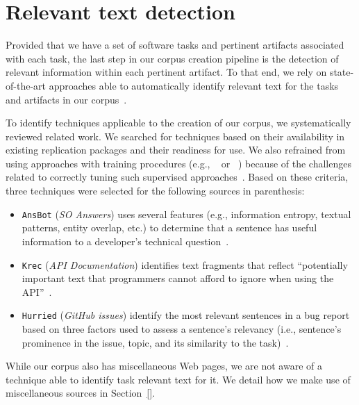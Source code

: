 


\section{Relevant text detection}
\label{cp4:corpus-relevant-text}


Provided that we have a set of software tasks and pertinent artifacts associated with each task, 
the last step in our corpus creation pipeline is the detection of relevant information within 
each pertinent artifact. To that end, we rely on state-of-the-art approaches able to automatically identify relevant text for the tasks and artifacts in our corpus~\cite{nadi2020, Robillard2015, Lotufo2012, Xu2017}.


To identify techniques applicable to the creation of our corpus, we systematically reviewed related work. We searched for techniques based on their availability in existing replication packages and their readiness for use.
We also refrained from using approaches with training procedures (e.g., ~\cite{liu2020} or ~\cite{Treude2016}) because of the challenges related to correctly tuning such supervised approaches~\cite{Chaparro2017, fucci2019}. Based on these criteria, three techniques were selected for the following sources in parenthesis:


\begin{itemize}[leftmargin=\parindent, font=\normalfont\itshape]
    \item \texttt{\acs{AnsBot}} (\textit{SO Answers}) uses several features (e.g., information entropy, textual patterns, entity overlap, etc.) to determine that a sentence has useful information to a developer's technical question~\cite{Xu2017}.
    
    \item \texttt{\acs{Krec}} (\textit{API Documentation}) identifies text fragments that reflect ``potentially important text that programmers cannot afford to ignore when using the API''~\cite{Robillard2015}.
    
    \item \texttt{\acs{Hurried}} (\textit{GitHub issues}) identify the most relevant sentences in a bug report based on three factors used to assess a sentence's relevancy (i.e., sentence's prominence in the issue, topic, and its similarity to the task)~\cite{Lotufo2012}.
\end{itemize}



While our corpus also has miscellaneous Web pages, we are not aware of a technique able to identify task relevant text for it. We detail how we make use of miscellaneous sources in Section~\ref{}.


